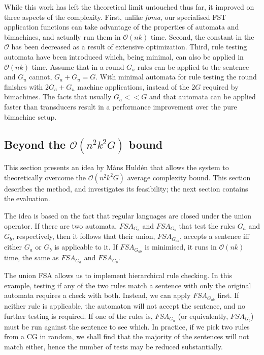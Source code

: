 \documentclass[11pt]{article}
\begin{document}
While this work has left the theoretical limit untouched thus far, it improved
on three aspects of the complexity.
First, unlike \emph{foma}, our specialised FST application functions can take
advantage of the properties of automata and bimachines, and actually run them
in $\mathcal{O}(nk)$ time.
Second, the constant in the $\mathcal{O}$ has been decreased as a result of
extensive optimization.
Third, rule testing automata have been introduced which, being minimal,
can also be applied in $\mathcal{O}(nk)$ time. Assume that in a round $G_a$
rules can be applied to the sentence and $G_u$ cannot, $G_a + G_u = G$. With
minimal automata for rule testing the round finishes with $2G_a + G_u$ machine
applications, instead of the $2G$ required by bimachines. The facts that usually
$G_a << G$ and that automata can be applied faster than transducers result in a
performance improvement over the pure bimachine setup.


\subsection{Beyond the $\mathcal{O}(n^2k^2G)$ bound}
\label{sec:complex_idea}

This section presents an idea by Måns Huldén that allows the system to
theoretically overcome the $\mathcal{O}(n^2k^2G)$ average complexity bound.
This section describes the method, and investigates its feasibility; the
next section contains the evaluation.

The idea is based on the fact that regular languages are closed under the union
operator. If there are two automata, $FSA_{G_a}$ and $FSA_{G_b}$ that test the
rules $G_a$ and $G_b$, respectively, then it follows that their union,
$FSA_{G_{ab}}$, accepts a sentence iff either $G_a$ or $G_b$ is applicable to it.
If $FSA_{G_{ab}}$ is minimised, it runs in $\mathcal{O}(nk)$ time, the same as
$FSA_{G_a}$ and $FSA_{G_b}$.

The union FSA allows us to implement hierarchical rule checking. In this example,
testing if any of the two rules match a sentence with only the original
automata requires a check with both. Instead, we can apply $FSA_{G_{ab}}$ first.
If neither rule is applicable, the automaton will not accept the sentence, and
no further testing is required. If one of the rules is, $FSA_{G_a}$ (or
equivalently, $FSA_{G_b}$) must be run against the sentence to see which. In
practice, if we pick two rules from a CG in random, we shall find that the
majority of the sentences will not match either, hence the number of tests may
be reduced substantially.
\end{document}
